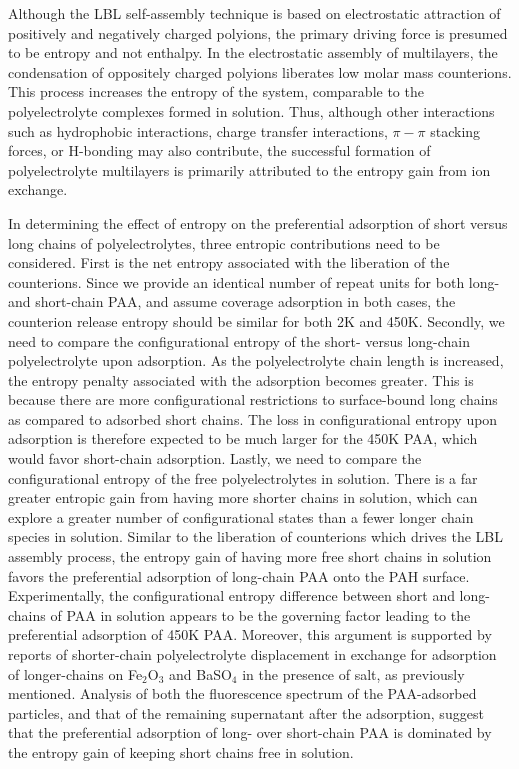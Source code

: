 \documentclass[journal=mamobx,manuscript=article]{achemso}
\begin{document}
Although the LBL self-assembly technique is based on electrostatic attraction of positively and negatively charged polyions, the primary driving force is presumed to be entropy and not enthalpy.  In the electrostatic assembly of multilayers, the condensation of oppositely charged polyions liberates low molar mass counterions.  This process increases the entropy of the system, comparable to the polyelectrolyte complexes formed in solution.\cite{Kabanov1994,Philipp1989}  Thus, although other interactions such as hydrophobic interactions, charge transfer interactions, $\pi{-}\pi$ stacking forces, or H-bonding may also contribute, the successful formation of polyelectrolyte multilayers is primarily attributed to the entropy gain from ion 
exchange.\cite{Kotov1999,Bertrand2000}  

In determining the effect of entropy on the preferential adsorption of short versus long chains of polyelectrolytes, three entropic contributions need to be considered.  First is the net entropy associated with the liberation of the counterions.  Since we provide an identical number of repeat units for both long- and short-chain PAA, and assume coverage adsorption in both cases, the counterion release entropy should be similar for both 2K and 450K.  Secondly, we need to compare the configurational entropy of the short- versus long-chain polyelectrolyte upon adsorption.  As the polyelectrolyte chain length is increased, the entropy penalty associated with the adsorption becomes greater.  This is because there are more configurational restrictions to surface-bound long chains as compared to adsorbed short chains.  The loss in configurational entropy upon adsorption is therefore expected to be much larger for the 450K PAA, which would favor short-chain adsorption.  Lastly, we need to compare the configurational entropy of the free polyelectrolytes in solution.  There is a far greater entropic gain from having more shorter chains in solution, which can explore a greater number of configurational states than a fewer longer chain species in solution.  Similar to the liberation of counterions which drives the LBL assembly process, the entropy gain of having more free short chains in solution favors the preferential adsorption of long-chain PAA onto the PAH surface.  Experimentally, the configurational entropy difference between short and long-chains of PAA in solution appears to be the governing factor leading to the preferential adsorption of 450K PAA.  Moreover, this argument is supported by reports of shorter-chain polyelectrolyte displacement in exchange for adsorption of longer-chains on Fe$_2$O$_3$ and BaSO$_4$ in the presence of salt, as previously mentioned.\cite{DeLaat1995}  Analysis of both the fluorescence spectrum of the PAA-adsorbed particles, and that of the remaining supernatant after the adsorption, suggest that the preferential adsorption of long- over short-chain PAA is dominated by the entropy gain of keeping short chains free in solution.
\end{document}

